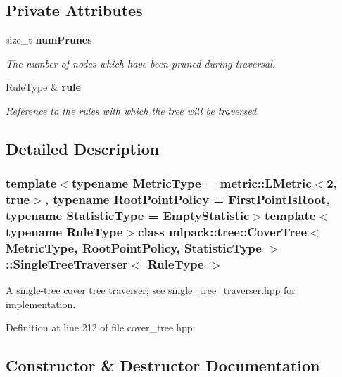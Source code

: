 \subsection*{Private Attributes}
\begin{DoxyCompactItemize}
\item 
size\-\_\-t {\bf num\-Prunes}
\begin{DoxyCompactList}\small\item\em The number of nodes which have been pruned during traversal. \end{DoxyCompactList}\item 
Rule\-Type \& {\bf rule}
\begin{DoxyCompactList}\small\item\em Reference to the rules with which the tree will be traversed. \end{DoxyCompactList}\end{DoxyCompactItemize}


\subsection{Detailed Description}
\subsubsection*{template$<$typename Metric\-Type = metric\-::\-L\-Metric$<$2, true$>$, typename Root\-Point\-Policy = First\-Point\-Is\-Root, typename Statistic\-Type = Empty\-Statistic$>$template$<$typename Rule\-Type$>$class mlpack\-::tree\-::\-Cover\-Tree$<$ Metric\-Type, Root\-Point\-Policy, Statistic\-Type $>$\-::\-Single\-Tree\-Traverser$<$ Rule\-Type $>$}

A single-\/tree cover tree traverser; see single\-\_\-tree\-\_\-traverser.\-hpp for implementation. 



Definition at line 212 of file cover\-\_\-tree.\-hpp.



\subsection{Constructor \& Destructor Documentation}
